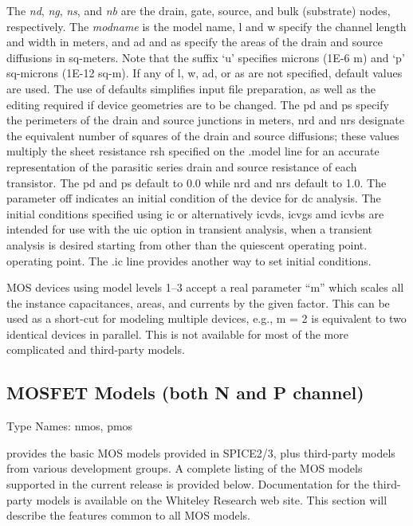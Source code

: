 The {\it nd\/}, {\it ng\/}, {\it ns\/}, and {\it nb} are the drain,
gate, source, and bulk (substrate) nodes, respectively.  The {\it
modname\/} is the model name, {\vt l} and {\vt w} specify the
channel length and width in meters, and {\vt ad} and {\vt as}
specify the areas of the drain and source diffusions in sq-meters. 
Note that the suffix `u' specifies microns (1E-6 m) and `p'
sq-microns (1E-12 sq-m).  If any of {\vt l}, {\vt w}, {\vt ad}, or
{\vt as} are not specified, default values are used.  The use of
defaults simplifies input file preparation, as well as the editing
required if device geometries are to be changed.  The {\vt pd} and
{\vt ps} specify the perimeters of the drain and source junctions in
meters, {\vt nrd} and {\vt nrs} designate the equivalent number of
squares of the drain and source diffusions; these values multiply
the sheet resistance {\vt rsh} specified on the {\vt .model} line
for an accurate representation of the parasitic series drain and
source resistance of each transistor.  The {\vt pd} and {\vt ps}
default to 0.0 while {\vt nrd} and {\vt nrs} default to 1.0.  The
parameter {\vt off} indicates an initial condition of the device for
dc analysis.  The initial conditions specified using {\vt ic} or
alternatively {\vt icvds}, {\vt icvgs} amd {\vt icvbs} are intended
for use with the {\vt uic} option in transient analysis, when a
transient analysis is desired starting from other than the quiescent
operating point.  operating point.  The {\vt .ic} line provides
another way to set initial conditions.

MOS devices using model levels 1--3 accept a real parameter ``{\vt m}''
which scales all the instance capacitances, areas, and currents by the
given {\vt factor}.  This can be used as a short-cut for modeling
multiple devices, e.g., {\vt m = 2} is equivalent to two identical
devices in parallel.  This is not available for most of the more
complicated and third-party models.

\subsection{MOSFET Models (both N and P channel)}
\label{mosmodel}


{\cb Type Names:} {\vt nmos}, {\vt pmos}

{\WRspice} provides the basic MOS models provided in SPICE2/3, plus
third-party models from various development groups.  A complete
listing of the MOS models supported in the current {\WRspice} release
is provided below.  Documentation for the third-party models is
available on the Whiteley Research web site.  This section will
describe the features common to all MOS models.

